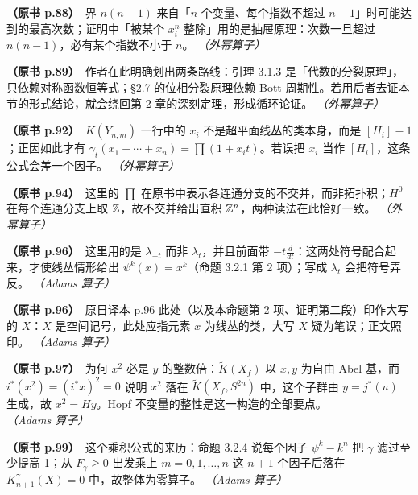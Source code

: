\noindent \textbf{（原书 p.88）}\ 界 $n(n-1)$ 来自「$n$ 个变量、每个指数不超过 $n-1$」时可能达到的最高次数；证明中「被某个 $x_i^n$ 整除」用的是抽屉原理：次数一旦超过 $n(n-1)$，必有某个指数不小于 $n$。 \textit{（外幂算子）}\par\smallskip

\noindent \textbf{（原书 p.89）}\ 作者在此明确划出两条路线：引理 3.1.3 是「代数的分裂原理」，只依赖对称函数恒等式；§2.7 的位相分裂原理依赖 Bott 周期性。若用后者去证本节的形式结论，就会绕回第 2 章的深刻定理，形成循环论证。 \textit{（外幂算子）}\par\smallskip

\noindent \textbf{（原书 p.92）}\ $K(Y_{n,m})$ 一行中的 $x_i$ 不是超平面线丛的类本身，而是 $[H_i]-1$；正因如此才有 $\gamma_t(x_1+\cdots+x_n)=\prod(1+x_it)$。若误把 $x_i$ 当作 $[H_i]$，这条公式会差一个因子。 \textit{（外幂算子）}\par\smallskip

\noindent \textbf{（原书 p.94）}\ 这里的 $\prod$ 在原书中表示各连通分支的不交并，而非拓扑积；$H^0$ 在每个连通分支上取 $\mathbb{Z}$，故不交并给出直积 $\mathbb{Z}^n$，两种读法在此恰好一致。 \textit{（外幂算子）}\par\smallskip

\noindent \textbf{（原书 p.96）}\ 这里用的是 $\lambda_{-t}$ 而非 $\lambda_t$，并且前面带 $-t\frac{d}{dt}$：这两处符号配合起来，才使线丛情形给出 $\psi^k(x)=x^k$（命题 3.2.1 第 2 项）；写成 $\lambda_t$ 会把符号弄反。 \textit{（Adams 算子）}\par\smallskip

\noindent \textbf{（原书 p.96）}\ 原日译本 p.96 此处（以及本命题第 2 项、证明第二段）印作大写的 $X$：$X$ 是空间记号，此处应指元素 $x$ 为线丛的类，大写 $X$ 疑为笔误；正文照印。 \textit{（Adams 算子）}\par\smallskip

\noindent \textbf{（原书 p.97）}\ 为何 $x^2$ 必是 $y$ 的整数倍：$\tilde K(X_f)$ 以 $x,y$ 为自由 Abel 基，而 $i^*(x^2)=(i^*x)^2=0$ 说明 $x^2$ 落在 $\tilde K(X_f,S^{2n})$ 中，这个子群由 $y=j^*(u)$ 生成，故 $x^2=Hy$。Hopf 不变量的整性是这一构造的全部要点。 \textit{（Adams 算子）}\par\smallskip

\noindent \textbf{（原书 p.99）}\ 这个乘积公式的来历：命题 3.2.4 说每个因子 $\psi^k-k^n$ 把 $\gamma$ 滤过至少提高 1；从 $F_\gamma\ge0$ 出发乘上 $m=0,1,\dots,n$ 这 $n+1$ 个因子后落在 $K_{n+1}^\gamma(X)=0$ 中，故整体为零算子。 \textit{（Adams 算子）}\par\smallskip

